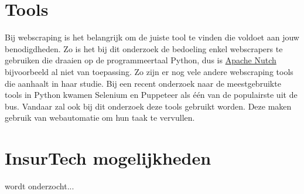\section{Tools}

Bij webscraping is het belangrijk om de juiste tool te vinden die voldoet aan jouw benodigdheden.
Zo is het bij dit onderzoek de bedoeling enkel webscrapers te gebruiken die draaien op de programmeertaal Python, dus is \href{https://nutch.apache.org}{Apache Nutch} bijvoorbeeld al niet van toepassing. Zo zijn er nog vele andere webscraping tools die \textcite{Sirisuriya2015} aanhaalt in haar studie.
Bij een recent onderzoek naar de meestgebruikte tools in Python kwamen Selenium en Puppeteer als één van de populairste uit de bus. \autocite{Saurkar2018}
Vandaar zal ook bij dit onderzoek deze tools gebruikt worden. Deze maken gebruik van webautomatie om hun taak te vervullen.

\section{InsurTech mogelijkheden}
wordt onderzocht...
